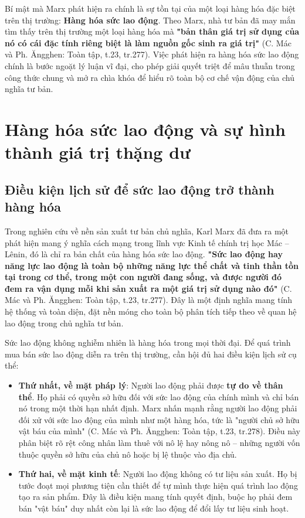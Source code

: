 Bí mật mà Marx phát hiện ra chính là sự tồn tại của một loại hàng hóa đặc biệt trên thị trường: \textbf{Hàng hóa sức lao động}. Theo Marx, nhà tư bản đã may mắn tìm thấy trên thị trường một loại hàng hóa mà \textbf{"bản thân giá trị sử dụng của nó có cái đặc tính riêng biệt là làm nguồn gốc sinh ra giá trị"} (C. Mác và Ph. Ăngghen: Toàn tập, t.23, tr.277). Việc phát hiện ra hàng hóa sức lao động chính là bước ngoặt lý luận vĩ đại, cho phép giải quyết triệt để mâu thuẫn trong công thức chung và mở ra chìa khóa để hiểu rõ toàn bộ cơ chế vận động của chủ nghĩa tư bản.

\section{Hàng hóa sức lao động và sự hình thành giá trị thặng dư}
\subsection{Điều kiện lịch sử để sức lao động trở thành hàng hóa}
Trong nghiên cứu về nền sản xuất tư bản chủ nghĩa, Karl Marx đã đưa ra một phát hiện mang ý nghĩa cách mạng trong lĩnh vực Kinh tế chính trị học Mác – Lênin, đó là chỉ ra bản chất của hàng hóa sức lao động. \textbf{"Sức lao động hay năng lực lao động là toàn bộ những năng lực thể chất và tinh thần tồn tại trong cơ thể, trong một con người đang sống, và được người đó đem ra vận dụng mỗi khi sản xuất ra một giá trị sử dụng nào đó"} (C. Mác và Ph. Ăngghen: Toàn tập, t.23, tr.277). Đây là một định nghĩa mang tính hệ thống và toàn diện, đặt nền móng cho toàn bộ phân tích tiếp theo về quan hệ lao động trong chủ nghĩa tư bản.

Sức lao động không nghiễm nhiên là hàng hóa trong mọi thời đại. Để quá trình mua bán sức lao động diễn ra trên thị trường, cần hội đủ hai điều kiện lịch sử cụ thể:
\begin{itemize}
    \item \textbf{Thứ nhất, về mặt pháp lý}: Người lao động phải được \textbf{tự do về thân thể}. Họ phải có quyền sở hữu đối với sức lao động của chính mình và chỉ bán nó trong một thời hạn nhất định. Marx nhấn mạnh rằng người lao động phải đối xử với sức lao động của mình như một hàng hóa, tức là "người chủ sở hữu vật báu của mình" (C. Mác và Ph. Ăngghen: Toàn tập, t.23, tr.278). Điều này phân biệt rõ rệt công nhân làm thuê với nô lệ hay nông nô – những người vốn thuộc quyền sở hữu của chủ nô hoặc bị lệ thuộc vào địa chủ.
    \item \textbf{Thứ hai, về mặt kinh tế}: Người lao động không có tư liệu sản xuất. Họ bị tước đoạt mọi phương tiện cần thiết để tự mình thực hiện quá trình lao động tạo ra sản phẩm. Đây là điều kiện mang tính quyết định, buộc họ phải đem bán "vật báu" duy nhất còn lại là sức lao động để đổi lấy tư liệu sinh hoạt.
\end{itemize}

